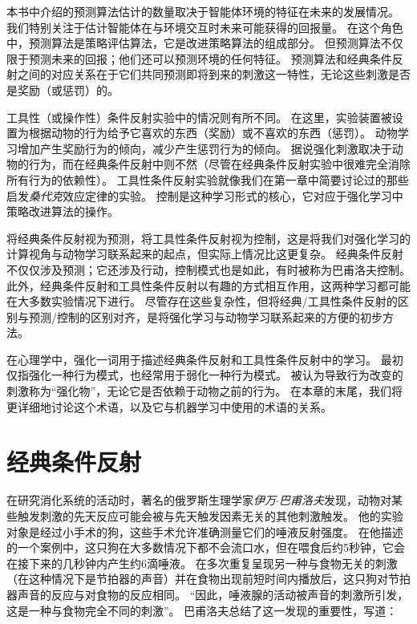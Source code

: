 本书中介绍的预测算法估计的数量取决于智能体环境的特征在未来的发展情况。
我们特别关注于估计智能体在与环境交互时未来可能获得的回报量。
在这个角色中，预测算法是策略评估算法，它是改进策略算法的组成部分。
但预测算法不仅限于预测未来的回报；他们还可以预测环境的任何特征\cite{modayil2014prediction}。
预测算法和经典条件反射之间的对应关系在于它们共同预测即将到来的刺激这一特性，无论这些刺激是否是奖励（或惩罚）的。


工具性（或操作性）条件反射实验中的情况则有所不同。
在这里，实验装置被设置为根据动物的行为给予它喜欢的东西（奖励）或不喜欢的东西（惩罚）。
动物学习增加产生奖励行为的倾向，减少产生惩罚行为的倾向。
据说强化刺激取决于动物的行为，而在经典条件反射中则不然（尽管在经典条件反射实验中很难完全消除所有行为的依赖性）。
工具性条件反射实验就像我们在第一章中简要讨论过的那些启发\textit{桑代克}效应定律的实验。
控制是这种学习形式的核心，它对应于强化学习中策略改进算法的操作。


将经典条件反射视为预测，将工具性条件反射视为控制，这是将我们对强化学习的计算视角与动物学习联系起来的起点，但实际上情况比这更复杂。
经典条件反射不仅仅涉及预测；它还涉及行动，控制模式也是如此，有时被称为巴甫洛夫控制。
此外，经典条件反射和工具性条件反射以有趣的方式相互作用，这两种学习都可能在大多数实验情况下进行。
尽管存在这些复杂性，但将经典/工具性条件反射的区别与预测/控制的区别对齐，是将强化学习与动物学习联系起来的方便的初步方法。


在心理学中，强化一词用于描述经典条件反射和工具性条件反射中的学习。
最初仅指强化一种行为模式，也经常用于弱化一种行为模式。
被认为导致行为改变的刺激称为“强化物”，无论它是否依赖于动物之前的行为。
在本章的末尾，我们将更详细地讨论这个术语，以及它与机器学习中使用的术语的关系。


\section{经典条件反射} \label{sec:classical_conditioning}

在研究消化系统的活动时，著名的俄罗斯生理学家\textit{伊万$\cdot$巴甫洛夫}发现，动物对某些触发刺激的先天反应可能会被与先天触发因素无关的其他刺激触发。
他的实验对象是经过小手术的狗，这些手术允许准确测量它们的唾液反射强度。
在他描述的一个案例中，这只狗在大多数情况下都不会流口水，但在喂食后约5秒钟，它会在接下来的几秒钟内产生约6滴唾液。
在多次重复呈现另一种与食物无关的刺激（在这种情况下是节拍器的声音）并在食物出现前短时间内播放后，这只狗对节拍器声音的反应与对食物的反应相同。
“因此，唾液腺的活动被声音的刺激所引发，这是一种与食物完全不同的刺激”。
巴甫洛夫总结了这一发现的重要性，写道：


